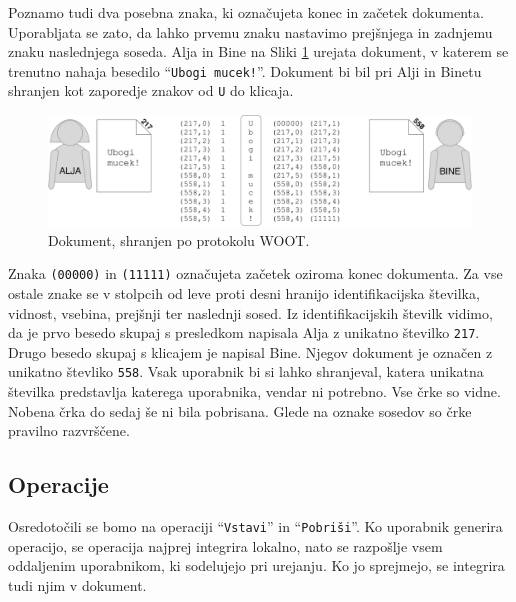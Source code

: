 \documentclass[a4paper, 12pt, twoside]{book}
\begin{document}
Poznamo tudi dva posebna znaka, ki označujeta konec in začetek dokumenta. Uporabljata se zato, da lahko prvemu znaku nastavimo prejšnjega in zadnjemu znaku naslednjega soseda. Alja in Bine na Sliki \ref{woot2} urejata dokument, v katerem se trenutno nahaja besedilo “{\tt Ubogi mucek!}”. Dokument bi bil pri Alji in Binetu shranjen kot zaporedje znakov od {\tt U} do klicaja.

\begin{figure}[placement h]
\begin{center}
\includegraphics[width=16cm]{img/woot2.pdf}
\end{center}
\caption{Dokument, shranjen po protokolu WOOT.}
\label{woot2}
\end{figure}

Znaka {\tt (00000)} in {\tt (11111)} označujeta začetek oziroma konec dokumenta. Za vse ostale znake se v stolpcih od leve proti desni hranijo identifikacijska številka, vidnost, vsebina, prejšnji ter naslednji sosed. Iz identifikacijskih številk vidimo, da je prvo besedo skupaj s presledkom napisala Alja z unikatno številko {\tt 217}. Drugo besedo skupaj s klicajem je napisal Bine. Njegov dokument je označen z unikatno števliko {\tt 558}. Vsak uporabnik bi si lahko shranjeval, katera unikatna številka predstavlja katerega uporabnika, vendar ni potrebno. Vse črke so vidne. Nobena črka do sedaj še ni bila pobrisana. Glede na oznake sosedov so črke pravilno razvrščene.

\subsection{Operacije}

Osredotočili se bomo na operaciji “{\tt Vstavi}” in “{\tt Pobriši}”. Ko uporabnik generira operacijo, se operacija najprej integrira lokalno, nato se razpošlje vsem oddaljenim uporabnikom, ki sodelujejo pri urejanju. Ko jo sprejmejo, se integrira tudi njim v dokument.
\end{document}
